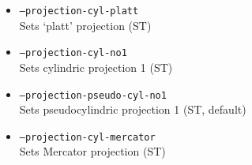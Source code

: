 \begin{itemize}
\item \texttt{--projection-cyl-platt} \\
Sets `platt' projection (ST)

\item \texttt{--projection-cyl-no1} \\
Sets cylindric projection 1 (ST)

\item \texttt{--projection-pseudo-cyl-no1} \\
Sets pseudocylindric projection 1 (ST, default)

\item \texttt{--projection-cyl-mercator} \\
Sets Mercator projection (ST)

\end{itemize}
